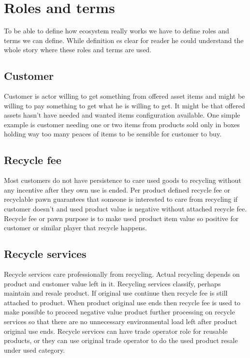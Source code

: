 \section{Roles and terms}
\label{roles_and_terms}
To be able to define how ecosystem really works we have to define roles and
terms we can define. While definition es clear for reader he could understand
the whole story where these roles and terms are used.

\subsection{Customer}
\label{customer}
Customer is actor willing to get something from offered asset items and might
be willing to pay something to get what he is willing to get. It might be that
offered assets hasn't have needed and wanted items configuration available.
One simple example is customer needing one or two items from products sold
only in boxes holding way too many peaces of items to be sensible for customer
to buy.

\subsection{Recycle fee}
\label{recycle_fee}
Most customers do not have persistence to care used goods to recycling without
any incentive after they own use is ended. Per product defined recycle fee or
recyclable pawn guarantees that someone is interested to care from recycling
if customer doesn't and used product value is negative without attached recycle
fee. Recycle fee or pawn purpose is to make used product item value so positive
for customer or similar player that recycle happens.

\subsection{Recycle services}
\label{recycle_services}
Recycle services care professionally from recycling. Actual recycling depends
on product and customer value left in it. Recycling services classify, perhaps
maintain and resale product. If original use continue then recycle fee is
still attached to product. When product original use ends then recycle fee is
used to make possible to proceed negative value product further processing on
recycle services so that there are no unnecessary environmental load left
after product original use ends. Recycle services can have trade operator role
for reusable products, or they can use original trade operator to do the used
product resale under used category.

